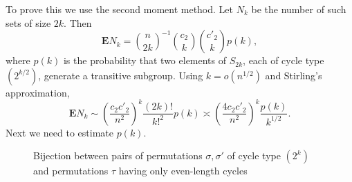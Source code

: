 \documentclass[ALCO,ThmDefs,Unicode,epreuves]{cedram}
\newcommand\E{\mathbf{E}}
\newcommand\br[1]{\left({#1}\right)}
\newcommand\pfrac[2]{\br{\frac{#1}{#2}}}
\begin{document}
To prove this we use the second moment method. Let $N_k$ be the number of such sets of size $2k$. Then
\[
 \E N_k = \binom{n}{2k}^{-1} \binom{c_2}{k} \binom{c'_2}{k} p(k),
\]
where $p(k)$ is the probability that two elements of $S_{2k}$, each of cycle type $(2^{k/2})$, generate a transitive subgroup. Using $k = o(n^{1/2})$ and Stirling's approximation,
\[
 \E N_k
 \sim \pfrac{c_2 c'_2}{n^2}^k \frac{(2k)!}{k!^2} p(k)
 \asymp \pfrac{4 c_2 c'_2}{n^2}^k \frac{p(k)}{k^{1/2}}.
\]
Next we need to estimate $p(k)$.

\begin{figure}[htb]\centering



% 
 \caption{Bijection between pairs of permutations $\sigma, \sigma'$ of cycle type $(2^k)$ and permutations $\tau$ having only even-length cycles}
 \label{fig:bijection}
\end{figure}
\end{document}
